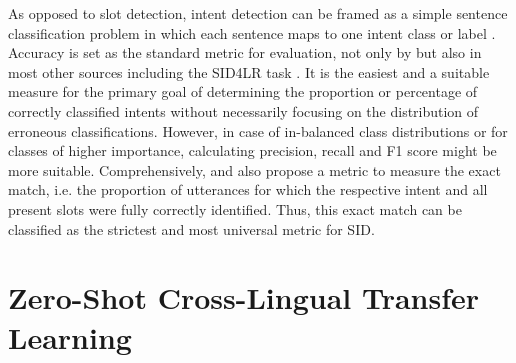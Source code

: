 \documentclass[11pt,a4paper,twoside,openright]{scrbook}
\begin{document}
As opposed to slot detection, intent detection can be framed as a simple sentence classification problem in which each sentence maps to one intent class or label \citep{bunk2020understanding}. Accuracy is set as the standard metric for evaluation, not only by \citet{van-der-goot-etal-2021-masked} but also in most other sources including the SID4LR task \citep{2023-findings-vardial, xu-etal-2020-end, larson2022survey}. It is the easiest and a suitable measure for the primary goal of determining the proportion or percentage of correctly classified intents without necessarily focusing on the distribution of erroneous classifications. However, in case of in-balanced class distributions or for classes of higher importance, calculating precision, recall and F1 score might be more suitable. Comprehensively, \citet{schuster-etal-2019-cross-lingual} and \citet{larson2022survey} also propose a metric to measure the exact match, i.e. the proportion of utterances for which the respective intent and all present slots were fully correctly identified. Thus, this exact match can be classified as the strictest and most universal metric for SID.







\section{Zero-Shot Cross-Lingual Transfer Learning}
\end{document}
